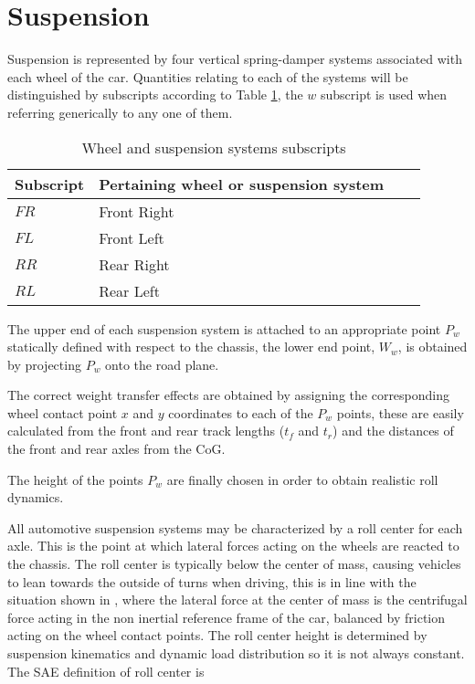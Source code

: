 

\section{Suspension}
\label{sec:suspension}
Suspension is represented by four vertical spring-damper systems associated with each wheel of the car. Quantities relating to each of the systems will be distinguished by subscripts according to Table \ref{table:subscripts}, the $w$ subscript is used when referring generically to any one of them.

\begin{table}[ht]
\caption{Wheel and suspension systems subscripts} %
\centering %
\begin{tabular}{l l l l} %
\hline\hline %
Subscript & Pertaining wheel or suspension system \\ [0.5ex] %
\hline %
$FR$ & Front Right \\ %
$FL$ & Front Left \\
$RR$ & Rear Right \\
$RL$ & Rear Left \\ [1ex] %
\hline %
\end{tabular}
\label{table:subscripts} %
\end{table}

The upper end of each suspension system is attached to an appropriate point $P_w$ statically defined with respect to the chassis, the lower end point, $W_w$, is obtained by projecting $P_w$ onto the road plane.

The correct weight transfer effects are obtained by assigning the corresponding wheel contact point $x$ and $y$ coordinates to each of the $P_w$ points, these are easily calculated from the front and rear track lengths ($t_f$ and $t_r$) and the distances of the front and rear axles from the CoG.

The height of the points $P_w$ are finally chosen in order to obtain realistic roll dynamics.

All automotive suspension systems may be characterized by a roll center for each axle. This is the point at which lateral forces acting on the wheels are reacted to the chassis.
The roll center is typically below the center of mass, causing vehicles to lean towards the outside of turns when driving, this is in line with the situation shown in , where the lateral force at the center of mass is the centrifugal force acting in the non inertial reference frame of the car, balanced by friction acting on the wheel contact points.
The roll center height is determined by suspension kinematics and dynamic load distribution so it is not always constant. The SAE definition of roll center is

